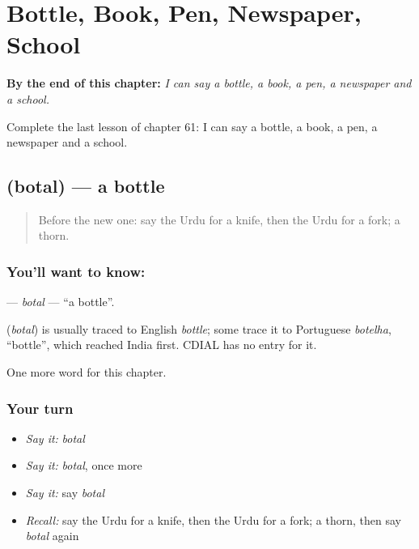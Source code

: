 
\chapter{Bottle, Book, Pen, Newspaper, School}
\label{ch:ur-bottle-book-pen-newspaper-school}

\begin{chapteropening}
\textbf{By the end of this chapter:} \emph{I can say a bottle, a book, a pen, a newspaper and a school.}

Complete the last lesson of chapter 61: I can say a bottle, a book, a pen, a newspaper and a school.
\end{chapteropening}

\section[\texorpdfstring{\ur{بوتل} (botal)}{بوتل (botal)}]{ (botal) — a bottle}

\label{lesson:UR-C61-botal}



\begin{quote}
Before the new one: say the Urdu for a knife, then the Urdu for a fork; a thorn.
\end{quote}

\subsection*{You'll want to know: }
\textbf{} — \emph{botal} — \textquotedblleft{}a bottle\textquotedblright{}.

\begin{cousinweb}
\textbf{} (\emph{botal}) is usually traced to English \emph{bottle}; some trace it to Portuguese \emph{botelha}, \textquotedblleft{}bottle\textquotedblright{}, which reached India first. CDIAL has no entry for it.
\end{cousinweb}

\begin{grammarlens}[title={What you've built}]
One more word for this chapter.
\end{grammarlens}

\subsection*{Your turn}
\begin{itemize}
\raggedright
  \item \emph{Say it:} \emph{botal}
  \item \emph{Say it:} \emph{botal}, once more
  \item \emph{Say it:} say \emph{botal}
  \item \emph{Recall:} say the Urdu for a knife, then the Urdu for a fork; a thorn, then say \emph{botal} again
\end{itemize}

